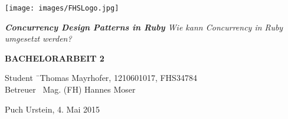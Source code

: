 \begin{titlepage}
\begin{center}

\texttt{[image: images/FHSLogo.jpg]}

\vspace*{4cm}

\Large{
	\textit{
		\textbf{Concurrency Design Patterns in Ruby} 
		\linebreak 
		Wie kann Concurrency in Ruby umgesetzt werden?
	}
}

\vspace*{4cm}

\large{
	\textbf{BACHELORARBEIT 2}
}

\end{center}

\vfill

\begin{tabbing}
Student \= \ Thomas Mayrhofer, 1210601017, FHS34784 \\
Betreuer \> \ Mag. (FH) Hannes Moser
\end{tabbing}

Puch Urstein, 4. Mai 2015

\end{titlepage}